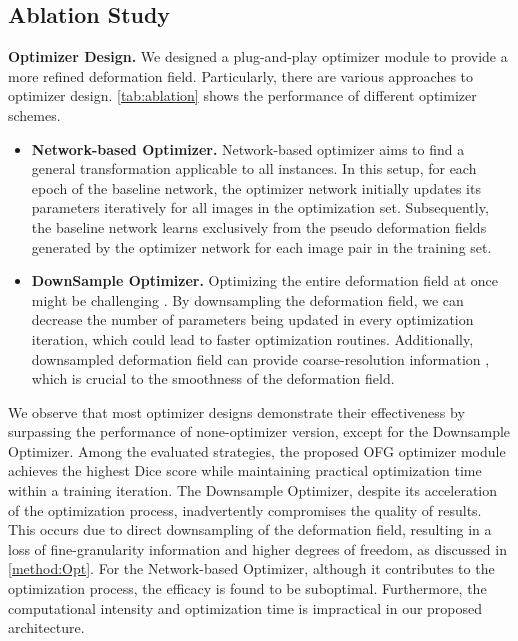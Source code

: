 \documentclass[10pt,twocolumn,letterpaper]{article}
\begin{document}
\subsection{Ablation Study}
\label{sec:ablation_study}
\textbf{Optimizer Design.} We designed a plug-and-play optimizer module to provide a more refined deformation field. Particularly, there are various approaches to optimizer design. \cref{tab:ablation} shows the performance of different optimizer schemes. 
\begin{itemize}
    \item \textbf{Network-based Optimizer.} Network-based optimizer aims to find a general transformation applicable to all instances. In this setup, for each epoch of the baseline network, the optimizer network initially updates its parameters iteratively for all images in the optimization set. Subsequently, the baseline network learns exclusively from the pseudo deformation fields generated by the optimizer network for each image pair in the training set. 
    \item \textbf{DownSample Optimizer.} Optimizing the entire deformation field at once might be challenging \cite{han2022diff}. By downsampling the deformation field, we can decrease the number of parameters being updated in every optimization iteration, which could lead to faster optimization routines. Additionally, downsampled deformation field can provide coarse-resolution information \cite{mok2020large}, which is crucial to the smoothness of the deformation field.
\end{itemize}
We observe that most optimizer designs demonstrate their effectiveness by surpassing the performance of none-optimizer version, except for the Downsample Optimizer. 
Among the evaluated strategies, the proposed OFG optimizer module achieves the highest Dice score while maintaining practical optimization time within a training iteration.
The Downsample Optimizer, despite its acceleration of the optimization process, inadvertently compromises the quality of results. This occurs due to direct downsampling of the deformation field, resulting in a loss of fine-granularity information and higher degrees of freedom, as discussed in \cref{method:Opt}. 
For the Network-based Optimizer, although it contributes to the optimization process, the efficacy is found to be suboptimal. Furthermore, the computational intensity and optimization time is impractical in our proposed architecture. 
\end{document}
